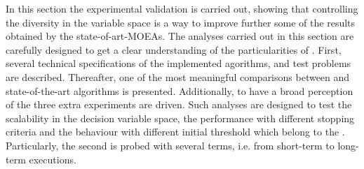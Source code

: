 In this section the experimental validation is carried out, showing that controlling the diversity in the variable space is a way to improve further some of the results obtained by the state-of-art-MOEAs.
%
The analyses carried out in this section are carefully designed to get a clear understanding of the particularities of \VSDMOEA{}.
%
First, several technical specifications of the implemented agorithms, and test problems are described.
%
Thereafter, one of the most meaningful comparisons between \VSDMOEA{} and state-of-the-art algorithms is presented.
%
Additionally, to have a broad perception of the \VSDMOEA{} three extra experiments are driven.
%
Such analyses are designed to test the scalability in the decision variable space, the performance with different stopping criteria and the behaviour with different initial threshold which belong to the \VSDMOEA{}.
%
Particularly, the second is probed with several terms, i.e. from short-term to long-term executions.


%
%
%
%
%
%
%
%
%

